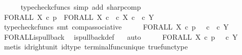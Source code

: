\begin{isabellebody}
\ \ \ \ \isamarkupfalse%
\ {\isacharparenleft}{\kern0pt}typecheck{\isacharunderscore}{\kern0pt}cfuncs{\isacharcomma}{\kern0pt}\ simp\ add{\isacharcolon}{\kern0pt}\ sharp{\isacharunderscore}{\kern0pt}comp{\isacharparenright}{\kern0pt}\isanewline
\ \ \isamarkupfalse%
\ \isamarkupfalse%
\ {\isachardoublequoteopen}FORALL\ X\ {\isasymcirc}\isactrlsub c\ p\isactrlsup {\isasymsharp}\ {\isacharequal}{\kern0pt}\ {\isacharparenleft}{\kern0pt}FORALL\ X\ {\isasymcirc}\isactrlsub c\ {\isacharparenleft}{\kern0pt}{\isasymt}\ {\isasymcirc}\isactrlsub c\ {\isasymbeta}\isactrlbsub X\ {\isasymtimes}\isactrlsub c\ {\isasymone}\isactrlesub {\isacharparenright}{\kern0pt}\isactrlsup {\isasymsharp}{\isacharparenright}{\kern0pt}\ {\isasymcirc}\isactrlsub c\ {\isasymbeta}\isactrlbsub Y\isactrlesub {\isachardoublequoteclose}\isanewline
\ \ \ \ \isamarkupfalse%
\ {\isacharparenleft}{\kern0pt}typecheck{\isacharunderscore}{\kern0pt}cfuncs{\isacharcomma}{\kern0pt}\ smt\ comp{\isacharunderscore}{\kern0pt}associative{}{\isacharparenright}{\kern0pt}\isanewline
\ \ \isamarkupfalse%
\ \isamarkupfalse%
\ {\isachardoublequoteopen}FORALL\ X\ {\isasymcirc}\isactrlsub c\ p\isactrlsup {\isasymsharp}\ {\isacharequal}{\kern0pt}\ {\isacharparenleft}{\kern0pt}{\isasymt}\ {\isasymcirc}\isactrlsub c\ {\isasymbeta}\isactrlbsub {\isasymone}\isactrlesub {\isacharparenright}{\kern0pt}\ {\isasymcirc}\isactrlsub c\ {\isasymbeta}\isactrlbsub Y\isactrlesub {\isachardoublequoteclose}\isanewline
\ \ \ \ \isamarkupfalse%
\ FORALL{\isacharunderscore}{\kern0pt}is{\isacharunderscore}{\kern0pt}pullback\ \isamarkupfalse%
\ is{\isacharunderscore}{\kern0pt}pullback{\isacharunderscore}{\kern0pt}def\ \ \isamarkupfalse%
\ auto\isanewline
\ \ \isamarkupfalse%
\ \isamarkupfalse%
\ {\isachardoublequoteopen}FORALL\ X\ {\isasymcirc}\isactrlsub c\ p\isactrlsup {\isasymsharp}\ {\isacharequal}{\kern0pt}\ {\isasymt}\ {\isasymcirc}\isactrlsub c\ {\isasymbeta}\isactrlbsub Y\isactrlesub {\isachardoublequoteclose}\isanewline
\ \ \ \ \isamarkupfalse%
\ {\isacharparenleft}{\kern0pt}metis\ id{\isacharunderscore}{\kern0pt}right{\isacharunderscore}{\kern0pt}unit{}\ id{\isacharunderscore}{\kern0pt}type\ terminal{\isacharunderscore}{\kern0pt}func{\isacharunderscore}{\kern0pt}unique\ true{\isacharunderscore}{\kern0pt}func{\isacharunderscore}{\kern0pt}type{\isacharparenright}{\kern0pt}\isanewline
{}\isamarkupfalse%

\end{isabellebody}
